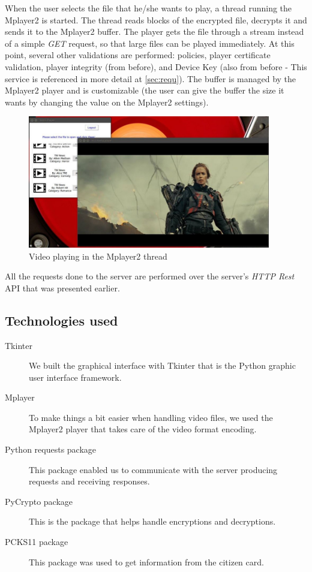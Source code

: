 \documentclass[11pt,a4paper]{report}
\begin{document}
When the user selects the file that he/she wants to play, a thread running the Mplayer2 is started. The thread reads blocks of the encrypted file, decrypts it and sends it to the Mplayer2 buffer.
The player gets the file through a stream instead of a simple \emph{GET} request, so that large files can be played immediately.
At this point, several other validations are performed: policies, player certificate validation, player integrity (from before), and Device Key (also from before - This service is referenced in more detail at \autoref{sec:requ}).
\newline
The buffer is managed by the Mplayer2 player and is customizable (the user can give the buffer the size it wants by changing the value on the Mplayer2 settings).

\begin{figure}[H]
\centerline{\includegraphics[width=300pt]{images/playerPlay.jpg}}
\caption{Video playing in the Mplayer2 thread}
\label{player}
\end{figure}


All the requests done to the server are performed over the server's \emph{HTTP Rest} API that was presented earlier.

\subsection{Technologies used}
\begin{description}
  \item[Tkinter] We built the graphical interface with Tkinter that is the Python graphic user interface framework.
  \item[Mplayer] To make things a bit easier when handling video files, we used the Mplayer2 player that takes care of the video format encoding.
  \item[Python requests package] This package enabled us to communicate with the server producing requests and receiving responses.
  \item[PyCrypto package] This is the package that helps handle encryptions and decryptions.
  \item[PCKS11 package] This package was used to get information from the citizen card.
\end{description}
\end{document}

